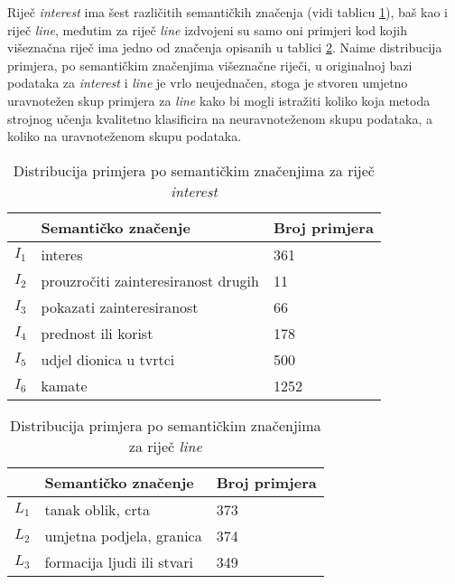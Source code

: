 \documentclass[10pt, a4paper]{article}
\begin{document}
Riječ \emph{interest} ima šest različitih semantičkih značenja (vidi tablicu \ref{tab:interest_distribution}), baš kao i riječ \emph{line},
međutim za riječ \emph{line} izdvojeni su samo oni primjeri kod kojih višeznačna riječ ima
jedno od značenja opisanih u tablici \ref{tab:line_distribution}.
Naime distribucija primjera, po semantičkim značenjima višeznačne riječi, u 
originalnoj bazi podataka za \emph{interest} i \emph{line} je vrlo neujednačen,
stoga je stvoren umjetno uravnotežen skup primjera za \emph{line} kako
bi mogli istražiti koliko koja metoda strojnog učenja
kvalitetno klasificira na neuravnoteženom skupu podataka, 
a koliko na uravnoteženom skupu podataka.

\begin{table}[!hbtp]
\caption{Distribucija primjera po semantičkim značenjima za riječ \emph{interest}}
\label{tab:interest_distribution}
\begin{center}
\begin{tabular}{lll}
\toprule
& Semantičko značenje & Broj primjera \\
\midrule
$I_1$ & interes  	 									& 361\\
$I_2$ & prouzročiti zainteresiranost drugih 			& 11\\
$I_3$ & pokazati zainteresiranost						& 66\\
$I_4$ & prednost ili korist 							& 178\\
$I_5$ & udjel dionica u tvrtci  						& 500\\
$I_6$ & kamate 											& 1252\\
\bottomrule
\end{tabular}
\end{center}
\end{table}

\begin{table}[!hbtp]
\caption{Distribucija primjera po semantičkim značenjima za riječ \emph{line}}
\label{tab:line_distribution}
\begin{center}
\begin{tabular}{lll}
\toprule
& Semantičko značenje & Broj primjera \\
\midrule
$L_1$ & tanak oblik, crta							& 373\\
$L_2$ & umjetna podjela, granica 					& 374\\
$L_3$ & formacija ljudi ili stvari					& 349\\
\bottomrule
\end{tabular}
\end{center}
\end{table}
\end{document}
